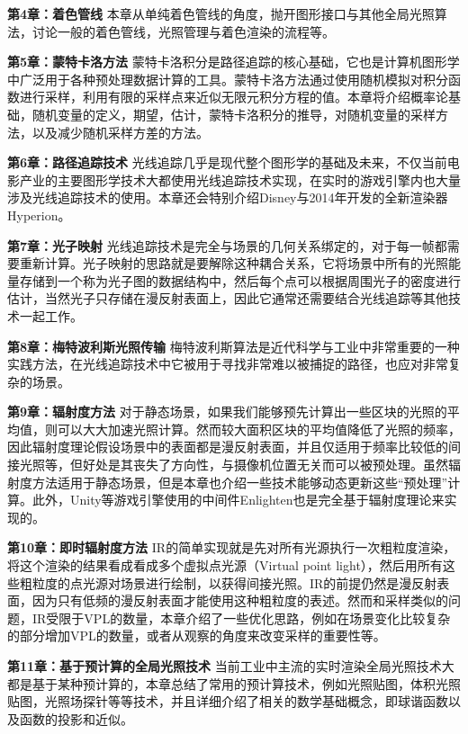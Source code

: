 \textbf{第4章：着色管线 } 本章从单纯着色管线的角度，抛开图形接口与其他全局光照算法，讨论一般的着色管线，光照管理与着色渲染的流程等。

\textbf{第5章：蒙特卡洛方法 } 蒙特卡洛积分是路径追踪的核心基础，它也是计算机图形学中广泛用于各种预处理数据计算的工具。蒙特卡洛方法通过使用随机模拟对积分函数进行采样，利用有限的采样点来近似无限元积分方程的值。本章将介绍概率论基础，随机变量的定义，期望，估计，蒙特卡洛积分的推导，对随机变量的采样方法，以及减少随机采样方差的方法。

\textbf{第6章：路径追踪技术 } 光线追踪几乎是现代整个图形学的基础及未来，不仅当前电影产业的主要图形学技术大都使用光线追踪技术实现，在实时的游戏引擎内也大量涉及光线追踪技术的使用。本章还会特别介绍Disney与2014年开发的全新渲染器Hyperion。

\textbf{第7章：光子映射 } 光线追踪技术是完全与场景的几何关系绑定的，对于每一帧都需要重新计算。光子映射的思路就是要解除这种耦合关系，它将场景中所有的光照能量存储到一个称为光子图的数据结构中，然后每个点可以根据周围光子的密度进行估计，当然光子只存储在漫反射表面上，因此它通常还需要结合光线追踪等其他技术一起工作。

\textbf{第8章：梅特波利斯光照传输 } 梅特波利斯算法是近代科学与工业中非常重要的一种实践方法，在光线追踪技术中它被用于寻找非常难以被捕捉的路径，也应对非常复杂的场景。


\textbf{第9章：辐射度方法 } 对于静态场景，如果我们能够预先计算出一些区块的光照的平均值，则可以大大加速光照计算。然而较大面积区块的平均值降低了光照的频率，因此辐射度理论假设场景中的表面都是漫反射表面，并且仅适用于频率比较低的间接光照等，但好处是其丧失了方向性，与摄像机位置无关而可以被预处理。虽然辐射度方法适用于静态场景，但是本章也介绍一些技术能够动态更新这些“预处理”计算。此外，Unity等游戏引擎使用的中间件Enlighten也是完全基于辐射度理论来实现的。


\textbf{第10章：即时辐射度方法 } IR的简单实现就是先对所有光源执行一次粗粒度渲染，将这个渲染的结果看成看成多个虚拟点光源（Virtual point light），然后用所有这些粗粒度的点光源对场景进行绘制，以获得间接光照。IR的前提仍然是漫反射表面，因为只有低频的漫反射表面才能使用这种粗粒度的表述。然而和采样类似的问题，IR受限于VPL的数量，本章介绍了一些优化思路，例如在场景变化比较复杂的部分增加VPL的数量，或者从观察的角度来改变采样的重要性等。

\textbf{第11章：基于预计算的全局光照技术 } 当前工业中主流的实时渲染全局光照技术大都是基于某种预计算的，本章总结了常用的预计算技术，例如光照贴图，体积光照贴图，光照场探针等等技术，并且详细介绍了相关的数学基础概念，即球谐函数以及函数的投影和近似。

